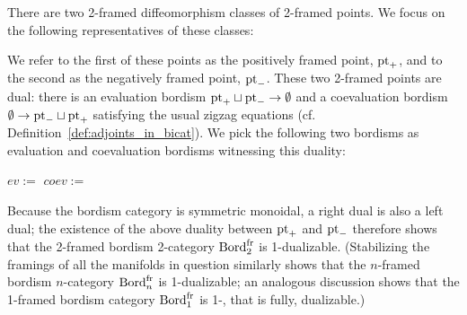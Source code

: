 \documentclass{amsart}
\begin{document}
There are two 2-framed diffeomorphism classes of 2-framed points.  We focus on the following representatives of these classes:
\begin{center}
\hspace{1.5cm}
\end{center}
We refer to the first of these points as the positively framed point, $\mathrm{pt}_+$, and to the second as the negatively framed point, $\mathrm{pt}_-$.  These two 2-framed points are dual: there is an evaluation bordism $\mathrm{pt}_+ \sqcup \mathrm{pt}_- \rightarrow \emptyset$ and a coevaluation bordism $\emptyset \rightarrow \mathrm{pt}_- \sqcup \mathrm{pt}_+$ satisfying the usual zigzag equations (cf. Definition~\ref{def:adjoints_in_bicat}).  We pick the following two bordisms as evaluation and coevaluation bordisms witnessing this duality:
\begin{center}
	$ev :=$
	\hspace{1.5cm}
	$coev :=$ 
\end{center}
Because the bordism category is symmetric monoidal, a right dual is also a left dual; the existence of the above duality between $\mathrm{pt}_+$ and $\mathrm{pt}_-$ therefore shows that the 2-framed bordism 2-category $\mathrm{Bord}^\mathrm{fr}_2$ is 1-dualizable.  (Stabilizing the framings of all the manifolds in question similarly shows that the $n$-framed bordism $n$-category $\mathrm{Bord}^\mathrm{fr}_n$ is 1-dualizable; an analogous discussion shows that the 1-framed bordism category $\mathrm{Bord}^\mathrm{fr}_1$ is 1-, that is fully, dualizable.)
\end{document}
